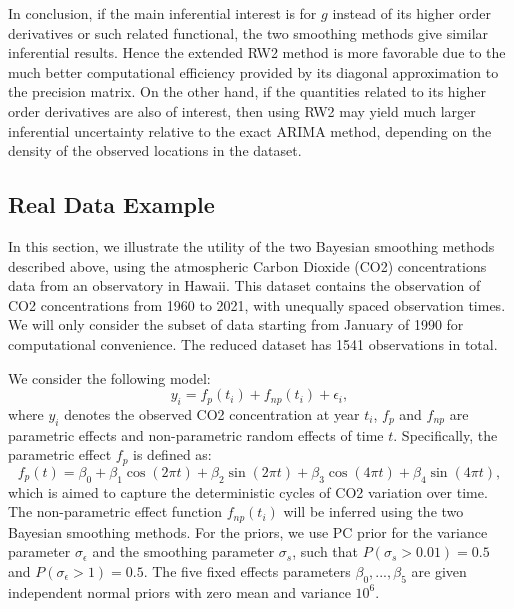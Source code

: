 \documentclass{article}
\begin{document}
In conclusion, if the main inferential interest is for $g$ instead of its higher order derivatives or such related functional, the two smoothing methods give similar inferential results. Hence the extended RW2 method is more favorable due to the much better computational efficiency provided by its diagonal approximation to the precision matrix. On the other hand, if the quantities related to its higher order derivatives are also of interest, then using RW2 may yield much larger inferential uncertainty relative to the exact ARIMA method, depending on the density of the observed locations in the dataset. 



\subsection{Real Data Example}\label{co2}

In this section, we illustrate the utility of the two Bayesian smoothing methods described above, using the atmospheric Carbon Dioxide (CO2) concentrations data from an observatory in Hawaii. This dataset contains the observation of CO2 concentrations from 1960 to 2021, with unequally spaced observation times. We will only consider the subset of data starting from January of 1990 for computational convenience. The reduced dataset has 1541 observations in total.

We consider the following model: $$y_i = f_{p}(t_i) + f_{np}(t_i) + \epsilon_i,$$ where $y_i$ denotes the observed CO2 concentration at year $t_i$, $f_{p}$ and $f_{np}$ are parametric effects and non-parametric random effects of time $t$. Specifically, the parametric effect $f_{p}$ is defined as: $$f_{p}(t) = \beta_0 + \beta_1 \cos(2\pi t) + \beta_2 \sin(2 \pi t) + \beta_3 \cos(4\pi t) + \beta_4 \sin(4\pi t),$$ which is aimed to capture the deterministic cycles of CO2 variation over time. The non-parametric effect function $f_{np}(t_i)$ will be inferred using the two Bayesian smoothing methods. For the priors, we use PC prior for the variance parameter $\sigma_\epsilon$ and the smoothing parameter $\sigma_s$, such that $P(\sigma_s > 0.01) = 0.5$ and $P(\sigma_\epsilon > 1) = 0.5$. The five fixed effects parameters $\beta_0, ..., \beta_5$ are given independent normal priors with zero mean and variance $10^6$.  
\end{document}
